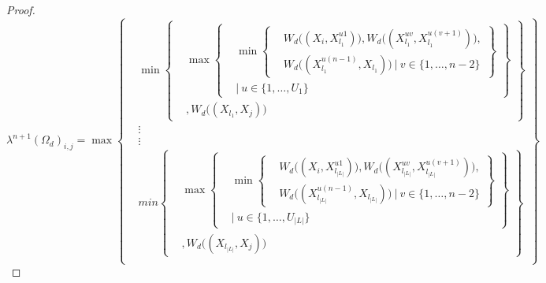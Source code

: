 \documentclass{article} %
\begin{document}
\begin{proof}
\[
\lambda^{n+1}(\Omega_d)_{i,j} =\max
\left\{
  \begin{aligned}
    &\min
      \left\{
      \begin{aligned}
        &\max
          \left\{
          \begin{aligned}
            &\min\left\{
            \begin{aligned}
            &W_d\big((X_i,X_{l_1}^{u1})\big), W_d\big((X_{l_1}^{uv},X_{l_1}^{u(v+1)})\big), \\
            &W_d\big((X_{l_1}^{u(n-1)},X_{l_1})\big)\ |\ v\in\{1,\ldots,n-2\}
            \end{aligned}
            \right\} \\
            &|\ u\in\{1,\ldots,U_1\}
          \end{aligned}
          \right\} \\
          &, W_d\big((X_{l_1},X_j)\big)
      \end{aligned}
      \right\} \\
      &\vdots \\
      &\vdots \\
    &min
      \left\{
      \begin{aligned}
        &\max
          \left\{
          \begin{aligned}
            &\min\left\{
            \begin{aligned}
            &W_d\big((X_i,X_{l_{|L|}}^{u1})\big), W_d\big((X_{l_{|L|}}^{uv},X_{l_{|L|}}^{u(v+1)})\big), \\
            &W_d\big((X_{l_{|L|}}^{u(n-1)},X_{l_{|L|}})\big)\ |\ v\in\{1,\ldots,n-2\}
            \end{aligned}
            \right\} \\
            &|\ u\in\{1,\ldots,U_{|L|}\}
          \end{aligned}
          \right\} \\
          &, W_d\big((X_{l_{|L|}},X_j)\big)
      \end{aligned}
      \right\} \\
  \end{aligned}
\right\}
\]


\end{proof}
\end{document}
